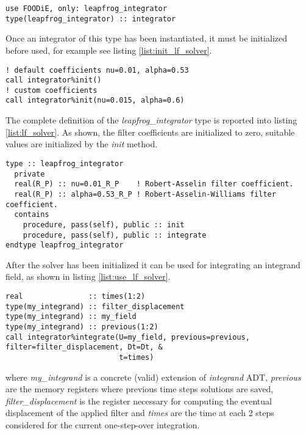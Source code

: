 \begin{lstlisting}[firstnumber=1,style=code,caption={definition of an explicit Leapfrog integrator},label={list:define_lf_solver}]
use FOODiE, only: leapfrog_integrator
type(leapfrog_integrator) :: integrator
\end{lstlisting}

Once an integrator of this type has been instantiated, it must be initialized before used, for example see listing \ref{list:init_lf_solver}.

\begin{lstlisting}[firstnumber=1,style=code,caption={example of initialization of an explicit Leapfrog integrator},label={list:init_lf_solver}]
! default coefficients nu=0.01, alpha=0.53
call integrator%init()
! custom coefficients
call integrator%init(nu=0.015, alpha=0.6)
\end{lstlisting}

The complete definition of the \emph{leapfrog\_integrator} type is reported into listing \ref{list:lf_solver}. As shown, the filter coefficients are initialized to zero, suitable values are initialized by the \emph{init} method.

\begin{lstlisting}[firstnumber=1,style=code,caption={definition of \emph{leapfrog\_integrator} type},label={list:lf_solver}]
type :: leapfrog_integrator
  private
  real(R_P) :: nu=0.01_R_P    ! Robert-Asselin filter coefficient.
  real(R_P) :: alpha=0.53_R_P ! Robert-Asselin-Williams filter coefficient.
  contains
    procedure, pass(self), public :: init
    procedure, pass(self), public :: integrate
endtype leapfrog_integrator
\end{lstlisting}

After the solver has been initialized it can be used for integrating an integrand field, as shown in listing \ref{list:use_lf_solver}.

\begin{lstlisting}[firstnumber=1,style=code,caption={example of usage of a Leapfrog integrator},label={list:use_lf_solver}]
real               :: times(1:2)
type(my_integrand) :: filter_displacement
type(my_integrand) :: my_field
type(my_integrand) :: previous(1:2)
call integrator%integrate(U=my_field, previous=previous, filter=filter_displacement, Dt=Dt, &
                          t=times)
\end{lstlisting}
where \emph{my\_integrand} is a concrete (valid) extension of \emph{integrand} ADT, \emph{previous} are the memory registers where previous time steps solutions are saved, \emph{filter\_displacement} is the register necessary for computing the eventual displacement of the applied filter and \emph{times} are the time at each 2 steps considered for the current one-step-over integration.

